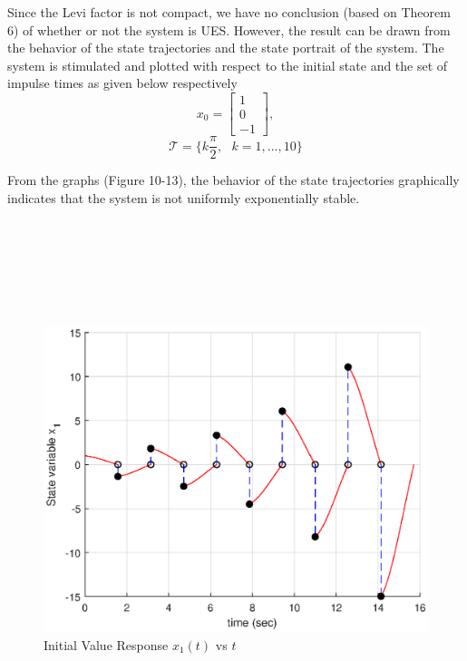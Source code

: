 \documentclass[11pt,a4paper]{article}
\begin{document}
Since the Levi factor is not compact, we have no conclusion (based on Theorem 6) of whether or not the system is UES. However, the result can be drawn from the behavior of the state trajectories and the state portrait of the system. The system is stimulated and plotted with respect to the initial state and the set of impulse times as given below respectively
$$
x_0 = 
\begin{bmatrix}
1 \\
0 \\
-1
\end{bmatrix},
$$
$$
\mathcal{T} = \{k \frac{\pi}{2} , \text{ } k = 1,...,10 \}
$$

From the graphs (Figure 10-13), the behavior of the state trajectories graphically indicates that the system is not uniformly exponentially stable. \\ 
\\
\\
\\
\\
\\
\\

\begin{figure}
\centering
\includegraphics[scale=0.8]{FG10.eps} 
\caption{Initial Value Response $x_1(t)$ vs $t$}
\end{figure}
\end{document}
